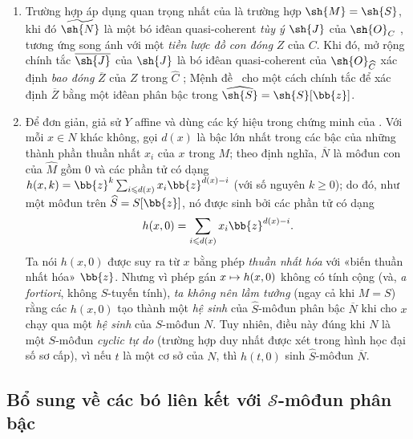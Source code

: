 \documentclass[oneside,10pt]{amsart}
\makeatletter
\renewcommand{\leq}{\leqslant}
\renewcommand{\geq}{\geqslant}
\newcommand{\ega@arrow}[2]{\mathchoice{#1}{#2}{#2}{#2}}
\let\ega@shortmapsto\mapsto
\renewcommand{\mapsto}{\ega@arrow{\longmapsto}{\ega@shortmapsto}}
\newcommand{\oldpage}[2][]{\marginnote{\normalfont\footnotesize\textbf{#1}~|~#2}\ignorespaces}
\let\EGAOriginalLabel\label
\renewcommand{\label}[1]{\phantomsection\EGAOriginalLabel{#1}}
\makeatother
\begin{document}
\begin{remark}[8.13.4]
\label{II.8.13.4}
\begin{enumerate}
    \item[\rm{(i)}] Trường hợp áp dụng quan trọng nhất của  là trường hợp $\sh{M}=\sh{S}$, khi đó $\widetilde{\sh{N}}$ là một bó iđêan quasi-coherent \emph{tùy ý} $\sh{J}$ của $\sh{O}_C$ , tương ứng song ánh với một \emph{tiền lược đồ con đóng} $Z$ của $C$.
        Khi đó, mở rộng chính tắc $\overline{\sh{J}}$ của $\sh{J}$ là bó iđêan quasi-coherent của $\sh{O}_{\widehat{C}}$ xác định \emph{bao đóng} $\overline{Z}$ của $Z$ trong $\widehat{C}$ ;
        Mệnh đề~ cho một cách chính tắc để xác định $\overline{Z}$ bằng một iđêan phân bậc trong $\widehat{\sh{S}}=\sh{S}[\bb{z}]$.
    \item[\rm{(ii)}] Để đơn giản, giả sử $Y$ affine và dùng các ký hiệu trong chứng minh của .
        Với mỗi $x\in N$ khác không, gọi $d(x)$ là bậc lớn nhất trong các bậc của những thành phần thuần nhất $x_i$ của $x$ trong $M$;
        theo định nghĩa, $\overline{N}$ là môđun con của $\widehat{M}$ gồm $0$ và các phần tử có dạng $h(x,k)=\bb{z}^k\sum_{i\leq d(x)}x_i\bb{z}^{d(x)-i}$ (với số nguyên $k\geq0$);
        do đó, như một môđun trên $\widehat{S}=S[\bb{z}]$, nó được sinh bởi các phần tử có dạng
        \[
            h(x,0) = \sum_{i\leq d(x)}x_i\bb{z}^{d(x)-i}.
        \]
\oldpage[II]{197}
        Ta nói $h(x,0)$ được suy ra từ $x$ bằng phép \emph{thuần nhất hóa} với «biến thuần nhất hóa» $\bb{z}$.
        Nhưng vì phép gán $x\mapsto h(x,0)$ không có tính cộng (và, \emph{a fortiori}, không $S$-tuyến tính), \emph{ta không nên lầm tưởng} (ngay cả khi $M=S$) rằng các $h(x,0)$ tạo thành một \emph{hệ sinh} của $\widehat{S}$-môđun phân bậc $\overline{N}$ khi cho $x$ chạy qua một \emph{hệ sinh} của $S$-môđun $N$.
        Tuy nhiên, điều này đúng khi $N$ là một $S$-môđun \emph{cyclic tự do} (trường hợp duy nhất được xét trong hình học đại số sơ cấp), vì nếu $t$ là một cơ sở của $N$, thì $h(t,0)$ sinh $\widehat{S}$-môđun $\overline{N}$.
\end{enumerate}
\end{remark}


\subsection{Bổ sung về các bó liên kết với $\mathcal{S}$-môđun phân bậc}
\label{subsection:II.8.14}
\end{document}
